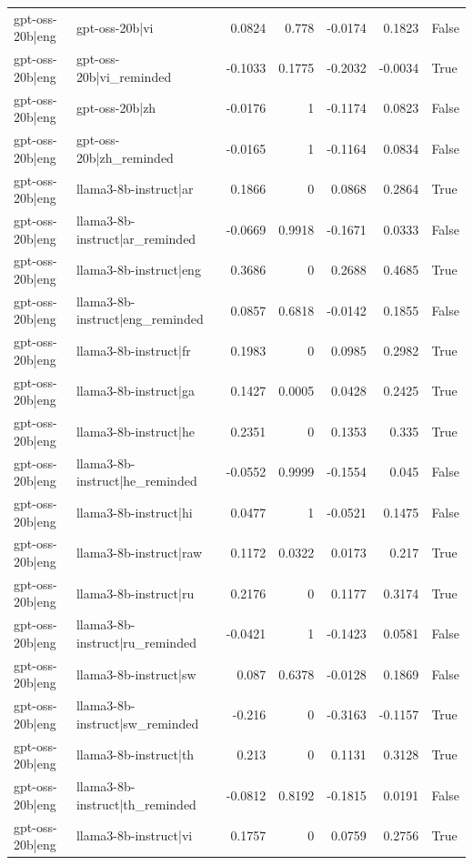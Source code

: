 \begin{table}
\begin{tabular}{l l r r r r l}
gpt-oss-20b|eng & gpt-oss-20b|vi & 0.0824 & 0.778 & -0.0174 & 0.1823 & False \\
gpt-oss-20b|eng & gpt-oss-20b|vi_reminded & -0.1033 & 0.1775 & -0.2032 & -0.0034 & True \\
gpt-oss-20b|eng & gpt-oss-20b|zh & -0.0176 & 1 & -0.1174 & 0.0823 & False \\
gpt-oss-20b|eng & gpt-oss-20b|zh_reminded & -0.0165 & 1 & -0.1164 & 0.0834 & False \\
gpt-oss-20b|eng & llama3-8b-instruct|ar & 0.1866 & 0 & 0.0868 & 0.2864 & True \\
gpt-oss-20b|eng & llama3-8b-instruct|ar_reminded & -0.0669 & 0.9918 & -0.1671 & 0.0333 & False \\
gpt-oss-20b|eng & llama3-8b-instruct|eng & 0.3686 & 0 & 0.2688 & 0.4685 & True \\
gpt-oss-20b|eng & llama3-8b-instruct|eng_reminded & 0.0857 & 0.6818 & -0.0142 & 0.1855 & False \\
gpt-oss-20b|eng & llama3-8b-instruct|fr & 0.1983 & 0 & 0.0985 & 0.2982 & True \\
gpt-oss-20b|eng & llama3-8b-instruct|ga & 0.1427 & 0.0005 & 0.0428 & 0.2425 & True \\
gpt-oss-20b|eng & llama3-8b-instruct|he & 0.2351 & 0 & 0.1353 & 0.335 & True \\
gpt-oss-20b|eng & llama3-8b-instruct|he_reminded & -0.0552 & 0.9999 & -0.1554 & 0.045 & False \\
gpt-oss-20b|eng & llama3-8b-instruct|hi & 0.0477 & 1 & -0.0521 & 0.1475 & False \\
gpt-oss-20b|eng & llama3-8b-instruct|raw & 0.1172 & 0.0322 & 0.0173 & 0.217 & True \\
gpt-oss-20b|eng & llama3-8b-instruct|ru & 0.2176 & 0 & 0.1177 & 0.3174 & True \\
gpt-oss-20b|eng & llama3-8b-instruct|ru_reminded & -0.0421 & 1 & -0.1423 & 0.0581 & False \\
gpt-oss-20b|eng & llama3-8b-instruct|sw & 0.087 & 0.6378 & -0.0128 & 0.1869 & False \\
gpt-oss-20b|eng & llama3-8b-instruct|sw_reminded & -0.216 & 0 & -0.3163 & -0.1157 & True \\
gpt-oss-20b|eng & llama3-8b-instruct|th & 0.213 & 0 & 0.1131 & 0.3128 & True \\
gpt-oss-20b|eng & llama3-8b-instruct|th_reminded & -0.0812 & 0.8192 & -0.1815 & 0.0191 & False \\
gpt-oss-20b|eng & llama3-8b-instruct|vi & 0.1757 & 0 & 0.0759 & 0.2756 & True \\

\end{tabular}
\end{table}
